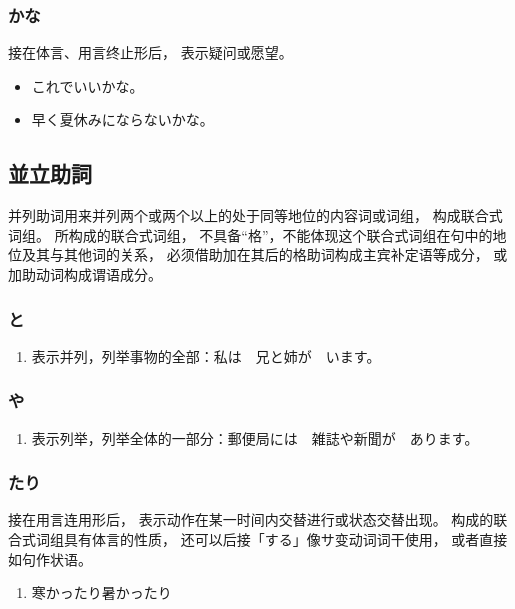 \subsubsection{かな}%

接在体言、用言终止形后，
表示疑问或愿望。
\begin{itemize}
  \item これでいいかな。
  \item 早く夏休みにならないかな。
\end{itemize}


\subsection{並立助詞}%

并列助词用来并列两个或两个以上的处于同等地位的内容词或词组，
构成联合式词组。
所构成的联合式词组，
不具备``格''，不能体现这个联合式词组在句中的地位及其与其他词的关系，
必须借助加在其后的格助词构成主宾补定语等成分，
或加助动词构成谓语成分。


\subsubsection{と}%

\begin{enumerate}
  \item 表示并列，列举事物的全部：私は　兄と姉が　います。
\end{enumerate}


\subsubsection{や}%

\begin{enumerate}
  \item 表示列举，列举全体的一部分：郵便局には　雑誌や新聞が　あります。
\end{enumerate}


\subsubsection{たり}%

接在用言连用形后，
表示动作在某一时间内交替进行或状态交替出现。
构成的联合式词组具有体言的性质，
还可以后接「する」像サ变动词词干使用，
或者直接如句作状语。

\begin{enumerate}
  \item 寒かったり暑かったり
\end{enumerate}


